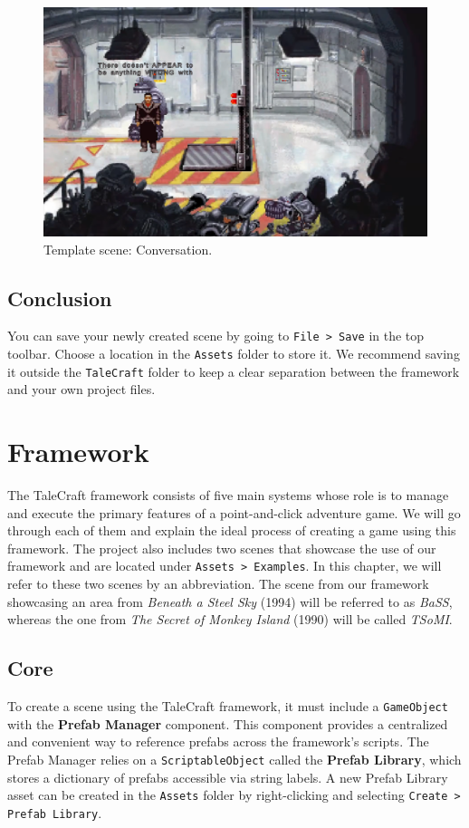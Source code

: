 \begin{figure}[H]
\centering
\includegraphics[width=0.85\linewidth]{img/User doc/manual-fin.png}
\caption{Template scene: Conversation.}
\label{fig:Tutorial-template:fin}
\end{figure}

\subsection{Conclusion}
You can save your newly created scene by going to \texttt{File > Save} in the top toolbar. Choose a location in the \texttt{Assets} folder to store it. We recommend saving it outside the \texttt{TaleCraft} folder to keep a clear separation between the framework and your own project files.


\section{Framework}
The TaleCraft framework consists of five main systems whose role is to manage and execute the primary features of a point-and-click adventure game. We will go through each of them and explain the ideal process of creating a game using this framework. The project also includes two scenes that showcase the use of our framework and are located under \verb|Assets > Examples|. In this chapter, we will refer to these two scenes by an abbreviation. The scene from our framework showcasing an area from \textit{Beneath a Steel Sky} (1994) will be referred to as \textit{BaSS}, whereas the one from \textit{The Secret of Monkey Island} (1990) will be called \textit{TSoMI}.

\subsection{Core}
\label{Manual:Core}
To create a scene using the TaleCraft framework, it must include a \verb|GameObject| with the \textbf{Prefab Manager} component. This component provides a centralized and convenient way to reference prefabs across the framework's scripts. The Prefab Manager relies on a \verb|ScriptableObject| called the \textbf{Prefab Library}, which stores a dictionary of prefabs accessible via string labels. A new Prefab Library asset can be created in the \verb|Assets| folder by right-clicking and selecting \verb|Create > Prefab Library|.

